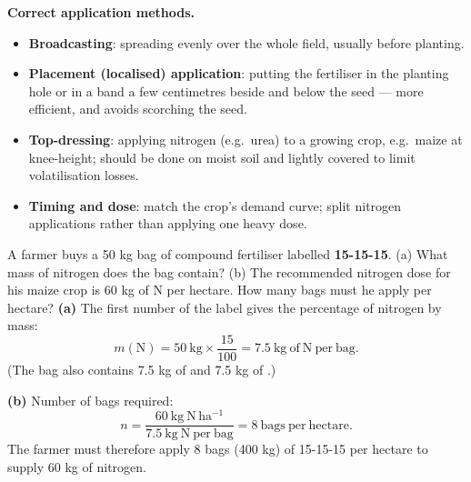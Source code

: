 \documentclass[11pt]{article}
\begin{document}
\textbf{Correct application methods.}
\begin{itemize}
\item \textbf{Broadcasting}: spreading evenly over the whole field, usually before planting.
\item \textbf{Placement (localised) application}: putting the fertiliser in the planting hole or in a band a few centimetres beside and below the seed --- more efficient, and avoids scorching the seed.
\item \textbf{Top-dressing}: applying nitrogen (e.g.\ urea) to a growing crop, e.g.\ maize at knee-height; should be done on moist soil and lightly covered to limit volatilisation losses.
\item \textbf{Timing and dose}: match the crop's demand curve; split nitrogen applications rather than applying one heavy dose.
\end{itemize}

\begin{exoresolu}
A farmer buys a 50 kg bag of compound fertiliser labelled \textbf{15-15-15}. (a) What mass of nitrogen does the bag contain? (b) The recommended nitrogen dose for his maize crop is 60 kg of N per hectare. How many bags must he apply per hectare?
\tcblower
\textbf{(a)} The first number of the label gives the percentage of nitrogen by mass:
\[ m(\mathrm{N}) = 50\ \mathrm{kg} \times \frac{15}{100} = 7.5\ \mathrm{kg\ of\ N\ per\ bag}. \]
(The bag also contains 7.5 kg of  and 7.5 kg of .)

\textbf{(b)} Number of bags required:
\[ n = \frac{60\ \mathrm{kg\ N\,ha^{-1}}}{7.5\ \mathrm{kg\ N\ per\ bag}} = 8\ \mathrm{bags\ per\ hectare}. \]
The farmer must therefore apply 8 bags (400 kg) of 15-15-15 per hectare to supply 60 kg of nitrogen.
\end{exoresolu}
\end{document}
